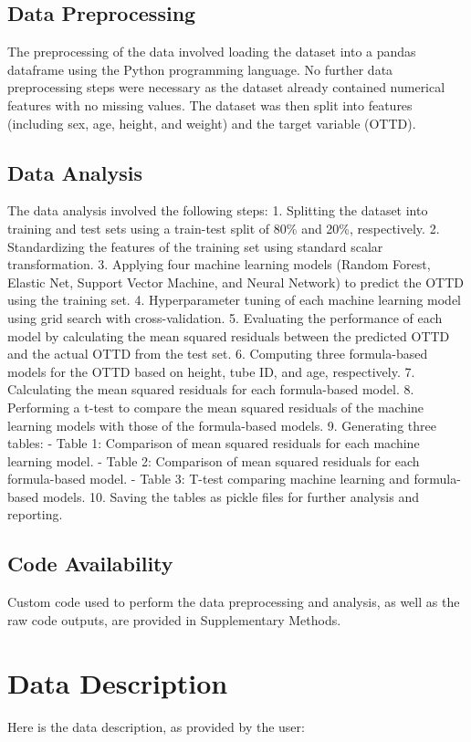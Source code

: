 \documentclass[11pt]{article}
\begin{document}
\subsection*{Data Preprocessing}
The preprocessing of the data involved loading the dataset into a pandas dataframe using the Python programming language. No further data preprocessing steps were necessary as the dataset already contained numerical features with no missing values. The dataset was then split into features (including sex, age, height, and weight) and the target variable (OTTD).

\subsection*{Data Analysis}
The data analysis involved the following steps:
1. Splitting the dataset into training and test sets using a train-test split of 80\% and 20\%, respectively.
2. Standardizing the features of the training set using standard scalar transformation.
3. Applying four machine learning models (Random Forest, Elastic Net, Support Vector Machine, and Neural Network) to predict the OTTD using the training set.
4. Hyperparameter tuning of each machine learning model using grid search with cross-validation.
5. Evaluating the performance of each model by calculating the mean squared residuals between the predicted OTTD and the actual OTTD from the test set.
6. Computing three formula-based models for the OTTD based on height, tube ID, and age, respectively.
7. Calculating the mean squared residuals for each formula-based model.
8. Performing a t-test to compare the mean squared residuals of the machine learning models with those of the formula-based models.
9. Generating three tables: 
    - Table 1: Comparison of mean squared residuals for each machine learning model.
    - Table 2: Comparison of mean squared residuals for each formula-based model.
    - Table 3: T-test comparing machine learning and formula-based models.
10. Saving the tables as pickle files for further analysis and reporting.\subsection*{Code Availability}

Custom code used to perform the data preprocessing and analysis, as well as the raw code outputs, are provided in Supplementary Methods.


\clearpage
\appendix

\section{Data Description} \label{sec:data_description} Here is the data description, as provided by the user:
\end{document}
